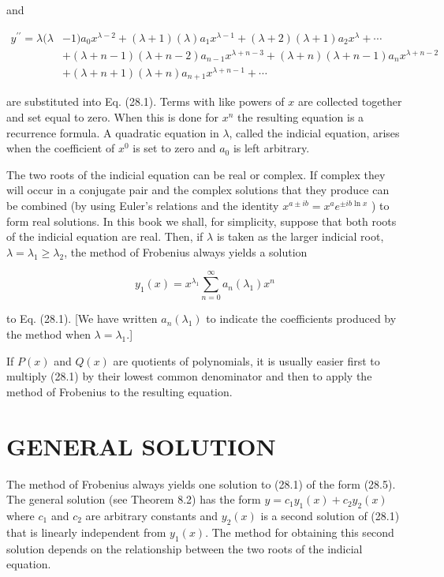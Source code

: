 \documentclass[10pt]{article}
\begin{document}
and


\begin{align*}
y^{\prime \prime}=\lambda(\lambda & -1) a_{0} x^{\lambda-2}+(\lambda+1)(\lambda) a_{1} x^{\lambda-1}+(\lambda+2)(\lambda+1) a_{2} x^{\lambda}+\cdots \\
& +(\lambda+n-1)(\lambda+n-2) a_{n-1} x^{\lambda+n-3}+(\lambda+n)(\lambda+n-1) a_{n} x^{\lambda+n-2} \\
& +(\lambda+n+1)(\lambda+n) a_{n+1} x^{\lambda+n-1}+\cdots \tag{28.4}
\end{align*}


are substituted into Eq. (28.1). Terms with like powers of $x$ are collected together and set equal to zero. When this is done for $x^{n}$ the resulting equation is a recurrence formula. A quadratic equation in $\lambda$, called the indicial equation, arises when the coefficient of $x^{0}$ is set to zero and $a_{0}$ is left arbitrary.

The two roots of the indicial equation can be real or complex. If complex they will occur in a conjugate pair and the complex solutions that they produce can be combined (by using Euler's relations and the identity $x^{a \pm i b}=x^{a} e^{ \pm i b \ln x}$ ) to form real solutions. In this book we shall, for simplicity, suppose that both roots of the indicial equation are real. Then, if $\lambda$ is taken as the larger indicial root, $\lambda=\lambda_{1} \geq \lambda_{2}$, the method of Frobenius always yields a solution


\begin{equation*}
y_{1}(x)=x^{\lambda_{1}} \sum_{n=0}^{\infty} a_{n}\left(\lambda_{1}\right) x^{n} \tag{28.5}
\end{equation*}


to Eq. (28.1). [We have written $a_{n}\left(\lambda_{1}\right)$ to indicate the coefficients produced by the method when $\lambda=\lambda_{1}$.]

If $P(x)$ and $Q(x)$ are quotients of polynomials, it is usually easier first to multiply (28.1) by their lowest common denominator and then to apply the method of Frobenius to the resulting equation.

\section*{GENERAL SOLUTION}
The method of Frobenius always yields one solution to (28.1) of the form (28.5). The general solution (see Theorem 8.2) has the form $y=c_{1} y_{1}(x)+c_{2} y_{2}(x)$ where $c_{1}$ and $c_{2}$ are arbitrary constants and $y_{2}(x)$ is a second solution of (28.1) that is linearly independent from $y_{1}(x)$. The method for obtaining this second solution depends on the relationship between the two roots of the indicial equation.
\end{document}
